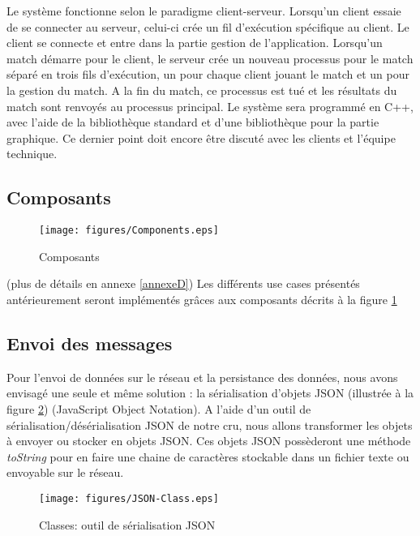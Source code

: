 Le système fonctionne selon le paradigme \gls{client}-\gls{serveur}.
Lorsqu'un client essaie de se connecter au serveur, celui-ci crée un fil d'exécution 
spécifique au client. Le client se connecte et entre dans la partie gestion de 
l'application. Lorsqu'un match démarre pour le client, le serveur crée un 
nouveau processus pour le match séparé en trois fils d'exécution, un pour 
chaque client jouant le match et un pour la gestion du match. A la fin du 
match, ce processus est tué et les résultats du match sont renvoyés au 
processus principal.
Le système sera programmé en C++, avec l'aide de la bibliothèque standard et 
d'une bibliothèque pour la partie graphique. Ce dernier point doit encore 
être discuté avec les clients et l'équipe technique.

\subsection{Composants}
\begin{figure}[h!]
  \centering
  \texttt{[image: figures/Components.eps]}
  \caption{\label{fig:Components} Composants}
\end{figure}
(plus de détails en annexe \ref{annexeD})
Les différents use cases présentés antérieurement seront implémentés grâces aux composants décrits à la figure \ref{fig:Components}

\subsection{Envoi des messages}
Pour l'envoi de données sur le réseau et la persistance des données, nous 
avons envisagé une seule et même solution : la sérialisation d'objets JSON (illustrée à la figure \ref{fig:Class:JSON})
(JavaScript Object Notation). A l'aide d'un outil de sérialisation/désérialisation JSON de notre 
cru, nous allons transformer les objets à envoyer ou stocker en objets JSON. 
Ces objets JSON possèderont une méthode \textit{toString} pour en faire une 
chaine de caractères stockable dans un fichier texte ou envoyable sur le 
réseau.

\begin{figure}[h!]
  \centering
  \texttt{[image: figures/JSON-Class.eps]}
  \caption{\label{fig:Class:JSON} Classes: outil de sérialisation JSON}
\end{figure}

